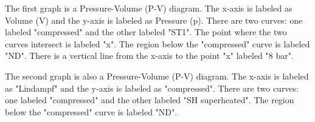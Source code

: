 The first graph is a Pressure-Volume (P-V) diagram. The x-axis is labeled as Volume (V) and the y-axis is labeled as Pressure (p). There are two curves: one labeled "compressed" and the other labeled "ST1". The point where the two curves intersect is labeled "x". The region below the "compressed" curve is labeled "ND". There is a vertical line from the x-axis to the point "x" labeled "8 bar".

The second graph is also a Pressure-Volume (P-V) diagram. The x-axis is labeled as "Lindampf" and the y-axis is labeled as "compressed". There are two curves: one labeled "compressed" and the other labeled "SH superheated". The region below the "compressed" curve is labeled "ND".